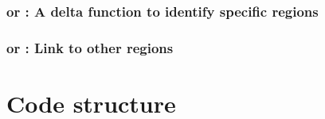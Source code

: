 \subsubsection{ or : A delta function to identify specific regions}
\subsubsection{ or : Link to other regions}

\pagebreak
\section{Code structure \label{sec:code_structure}}



